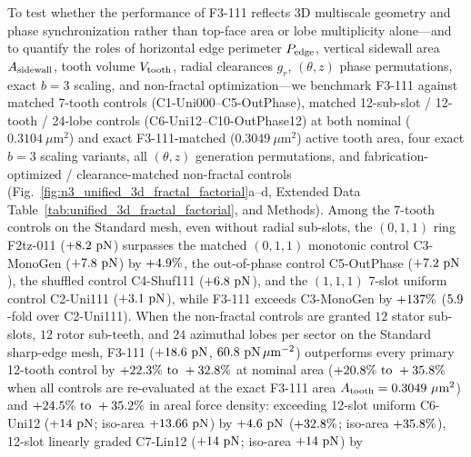\documentclass[pdflatex,sn-nature]{sn-jnl}
\DeclareRobustCommand{\roundzero}[1]{\fpeval{round(#1,0)}}
\DeclareRobustCommand{\roundone}[1]{\fpeval{round(#1,1)}}
\DeclareRobustCommand{\roundtwo}[1]{\fpeval{round(#1,2)}}
\DeclareRobustCommand{\roundfour}[1]{\fpeval{round(#1,4)}}
\begin{document}
To test whether the performance of F3-111 reflects 3D multiscale geometry and phase synchronization rather than top-face area or lobe multiplicity alone---and to quantify the roles of horizontal edge perimeter $P_{\rm edge}$, vertical sidewall area $A_{\rm sidewall}$, tooth volume $V_{\rm tooth}$, radial clearances $g_r$, $(\theta, z)$ phase permutations, exact $b=3$ scaling, and non-fractal optimization---we benchmark F3-111 against matched 7-tooth controls (C1-Uni000--C5-OutPhase), matched 12-sub-slot / 12-tooth / 24-lobe controls (C6-Uni12--C10-OutPhase12) at both nominal ($0.3104\ \mu\text{m}^2$) and exact F3-111-matched ($0.3049\ \mu\text{m}^2$) active tooth area, four exact $b=3$ scaling variants, all $(\theta, z)$ generation permutations, and fabrication-optimized / clearance-matched non-fractal controls (Fig.~\ref{fig:n3_unified_3d_fractal_factorial}a--d, Extended Data Table~\ref{tab:unified_3d_fractal_factorial}, and Methods). Among the 7-tooth controls on the Standard mesh, even without radial sub-slots, the $(0,1,1)$ ring F2tz-011 ($+\roundone{\NthreeUnithreedFzerooneoneThetazFzPn}\text{ pN}$) surpasses the matched $(0,1,1)$ monotonic control C3-MonoGen ($+\roundone{\NthreeUnithreedCtrlMonogenFzPn}\text{ pN}$) by $+\roundone{\NthreeUnithreedGainFzerooneoneVsMonogenPct}\%$, the out-of-phase control C5-OutPhase ($+\roundone{\NthreeUnithreedCtrlOutphaseFzPn}\text{ pN}$), the shuffled control C4-Shuf111 ($+\roundone{\NthreeUnithreedCtrlShuffledoneoneoneFzPn}\text{ pN}$), and the $(1,1,1)$ 7-slot uniform control C2-Uni111 ($+\roundone{\NthreeUnithreedCtrlUnioneoneoneFzPn}\text{ pN}$), while F3-111 exceeds C3-MonoGen by $+\roundzero{\NthreeUnithreedGainFoneoneoneVsMonogenPct}\%$ ($\roundone{\NthreeUnithreedRatioFoneoneoneVsUnioneoneone}$-fold over C2-Uni111). When the non-fractal controls are granted $12$ stator sub-slots, $12$ rotor sub-teeth, and $24$ azimuthal lobes per sector on the Standard sharp-edge mesh, F3-111 ($+\roundone{\NthreeUnithreedFoneoneoneUnifiedFzPn}\text{ pN}$, $\roundone{\NthreeUnithreedFoneoneoneUnifiedFa}\text{ pN}\,\mu\text{m}^{-2}$) outperforms every primary 12-tooth control by $+\roundone{\NthreeUnithreedGainFoneoneoneVsShufonetwoPct}\%\text{ to }+\roundone{\NthreeUnithreedGainFoneoneoneVsUnionetwoPct}\%$ at nominal area ($+\roundone{\NthreeIsothreezerofournineGainFoneoneoneVsShufonetwoPct}\%\text{ to }+\roundone{\NthreeIsothreezerofournineGainFoneoneoneVsUnionetwoPct}\%$ when all controls are re-evaluated at the exact F3-111 area $A_{\rm tooth} = \roundfour{\NthreeUnithreedFoneoneoneUnifiedAreaUmtwo}\ \mu\text{m}^2$) and $+\roundone{\NthreeUnithreedGainFoneoneoneVsShufonetwoFaPct}\%\text{ to }+\roundone{\NthreeUnithreedGainFoneoneoneVsUnionetwoFaPct}\%$ in areal force density: exceeding 12-slot uniform C6-Uni12 ($+\roundone{\NthreeUnithreedCtrlUnionetwoFzPn}\text{ pN}$; iso-area $+\roundtwo{\NthreeIsothreezerofournineCtrlUnionetwoFzPn}\text{ pN}$) by $+\roundone{\NthreeUnithreedGainFoneoneoneVsUnionetwoPn}\text{ pN}$ ($+\roundone{\NthreeUnithreedGainFoneoneoneVsUnionetwoPct}\%$; iso-area $+\roundone{\NthreeIsothreezerofournineGainFoneoneoneVsUnionetwoPct}\%$), 12-slot linearly graded C7-Lin12 ($+\roundone{\NthreeUnithreedCtrlLinonetwoFzPn}\text{ pN}$; iso-area $+\roundtwo{\NthreeIsothreezerofournineCtrlLinonetwoFzPn}\text{ pN}$) by 
\end{document}
